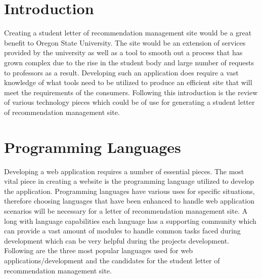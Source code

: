 \documentclass[onecolumn, draftclsnofoot,10pt, compsoc]{IEEEtran}
\begin{document}
\section{Introduction}
Creating a student letter of recommendation management site would be a great benefit to Oregon State University. The site would be an extension of services provided by the university as well as a tool to smooth out a process that has grown complex due to the rise in the student body and large number of requests to professors as a result. Developing such an application does require a vast knowledge of what tools need to be utilized to produce an efficient site that will meet the requirements of the consumers. Following this introduction is the review of various technology pieces which could be of use for generating a student letter of recommendation management site.

\section{Programming Languages}
Developing a web application requires a number of essential pieces. The most vital piece in creating a website is the programming language utilized to develop the application. Programming languages have various uses for specific situations, therefore choosing languages that have been enhanced to handle web application scenarios will be necessary for a letter of recommendation management site. A long with language capabilities each language has a supporting community which can provide a vast amount of modules to handle common tasks faced during development which can be very helpful during the projects development. Following are the three most popular languages used for web applications/development and the candidates for the student letter of recommendation management site.
\end{document}
